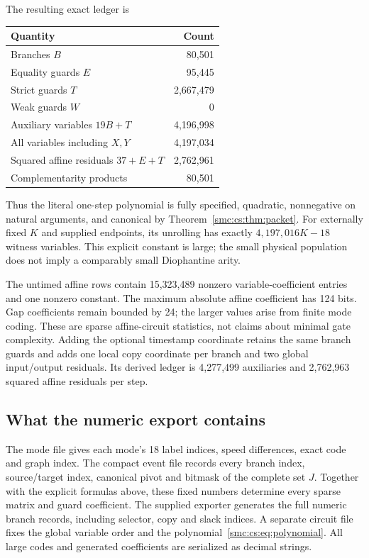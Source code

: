 \documentclass[11pt,letterpaper]{article}
\numberwithin{equation}{section}
\theoremstyle{definition}
\theoremstyle{remark}
\begin{document}
The resulting exact ledger is
\begin{center}
\begin{tabular}{lr}
\toprule
Quantity & Count\\
\midrule
Branches $B$ & 80,501\\
Equality guards $E$ & 95,445\\
Strict guards $T$ & 2,667,479\\
Weak guards $W$ & 0\\
Auxiliary variables $19B+T$ & 4,196,998\\
All variables including $X,Y$ & 4,197,034\\
Squared affine residuals $37+E+T$ & 2,762,961\\
Complementarity products & 80,501\\
\bottomrule
\end{tabular}
\end{center}
Thus the literal one-step polynomial is fully specified, quadratic, nonnegative on natural arguments, and canonical by Theorem~\ref{smc:cs:thm:packet}. For externally fixed $K$ and supplied endpoints, its unrolling has exactly $4{,}197{,}016K-18$ witness variables. This explicit constant is large; the small physical population does not imply a comparably small Diophantine arity.

The untimed affine rows contain 15,323,489 nonzero variable-coefficient entries and one nonzero constant. The maximum absolute affine coefficient has 124 bits. Gap coefficients remain bounded by 24; the larger values arise from finite mode coding. These are sparse affine-circuit statistics, not claims about minimal gate complexity. Adding the optional timestamp coordinate retains the same branch guards and adds one local copy coordinate per branch and two global input/output residuals. Its derived ledger is 4,277,499 auxiliaries and 2,762,963 squared affine residuals per step.

\subsection{What the numeric export contains}
The mode file gives each mode's 18 label indices, speed differences, exact code and graph index. The compact event file records every branch index, source/target index, canonical pivot and bitmask of the complete set $J$. Together with the explicit formulas above, these fixed numbers determine every sparse matrix and guard coefficient. The supplied exporter generates the full numeric branch records, including selector, copy and slack indices. A separate circuit file fixes the global variable order and the polynomial~\eqref{smc:cs:eq:polynomial}. All large codes and generated coefficients are serialized as decimal strings.
\end{document}
